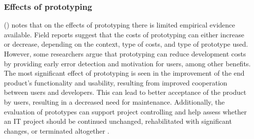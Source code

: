 \subsubsection*{Effects of prototyping}

\citeauthor{riedlManagementInformatik2019} (\citeyear{riedlManagementInformatik2019})
notes that on the effects of prototyping there is limited empirical evidence available.
Field reports suggest that the costs of prototyping can either increase or decrease,
depending on the context, type of costs, and type of prototype used.
However, some researchers argue that prototyping can reduce development costs
by providing early error detection and motivation for users, among other benefits.
The most significant effect of prototyping is seen in the improvement of the end product's functionality and usability,
resulting from improved cooperation between users and developers.
This can lead to better acceptance of the product by users, resulting in a decreased need for maintenance.
Additionally, the evaluation of prototypes can support project controlling and help assess whether
an IT project should be continued unchanged, rehabilitated with significant changes, or terminated altogether
\autocite{riedlManagementInformatik2019}.



























%

